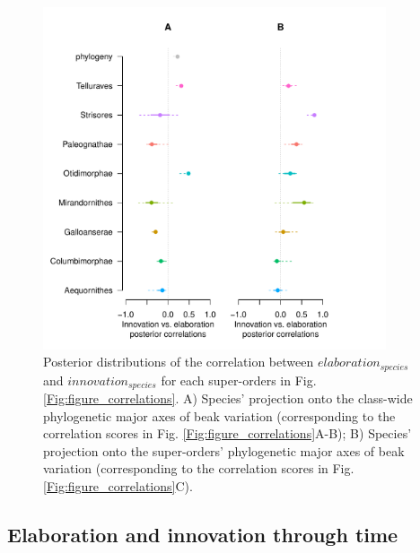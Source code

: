 \documentclass[12pt,a4paper]{article}
\begin{document}
\begin{figure}[H]
\centering
   \includegraphics[width=0.9\textwidth]{Figures/correlations_fable_super_orders.pdf}
\caption{Posterior distributions of the correlation between $elaboration_{species}$ and $innovation_{species}$ for each super-orders in Fig. \ref{Fig:figure_correlations}.
A) Species' projection onto the class-wide phylogenetic major axes of beak variation (corresponding to the correlation scores in Fig. \ref{Fig:figure_correlations}A-B); B) Species' projection onto the super-orders' phylogenetic major axes of beak variation (corresponding to the correlation scores in Fig. \ref{Fig:figure_correlations}C).}
\label{Fig:fable_correlations_supplementary}
\end{figure}

\newpage

\begin{landscape}

\end{landscape}

\newpage

\subsection{Elaboration and innovation through time}
\end{document}
